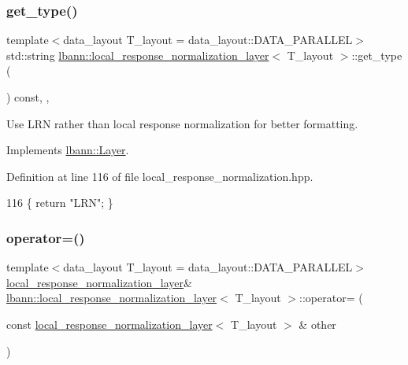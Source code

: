\subsubsection{\texorpdfstring{get\+\_\+type()}{get\_type()}}
{\footnotesize\ttfamily template$<$data\+\_\+layout T\+\_\+layout = data\+\_\+layout\+::\+D\+A\+T\+A\+\_\+\+P\+A\+R\+A\+L\+L\+EL$>$ \\
std\+::string \hyperlink{classlbann_1_1local__response__normalization__layer}{lbann\+::local\+\_\+response\+\_\+normalization\+\_\+layer}$<$ T\+\_\+layout $>$\+::get\+\_\+type (\begin{DoxyParamCaption}{ }\end{DoxyParamCaption}) const\hspace{0.3cm}{\ttfamily [inline]}, {\ttfamily [override]}, {\ttfamily [virtual]}}



Use L\+RN rather than local response normalization for better formatting. 



Implements \hyperlink{classlbann_1_1Layer_a0fa0ea9160b490c151c0a17fde4f7239}{lbann\+::\+Layer}.



Definition at line 116 of file local\+\_\+response\+\_\+normalization.\+hpp.


\begin{DoxyCode}
116 \{ \textcolor{keywordflow}{return} \textcolor{stringliteral}{"LRN"}; \}
\end{DoxyCode}
\mbox{\label{classlbann_1_1local__response__normalization__layer_a7a1e5eb532bbf72c6334ac865d0694a3}} 
\subsubsection{\texorpdfstring{operator=()}{operator=()}}
{\footnotesize\ttfamily template$<$data\+\_\+layout T\+\_\+layout = data\+\_\+layout\+::\+D\+A\+T\+A\+\_\+\+P\+A\+R\+A\+L\+L\+EL$>$ \\
\hyperlink{classlbann_1_1local__response__normalization__layer}{local\+\_\+response\+\_\+normalization\+\_\+layer}\& \hyperlink{classlbann_1_1local__response__normalization__layer}{lbann\+::local\+\_\+response\+\_\+normalization\+\_\+layer}$<$ T\+\_\+layout $>$\+::operator= (\begin{DoxyParamCaption}\item[{const \hyperlink{classlbann_1_1local__response__normalization__layer}{local\+\_\+response\+\_\+normalization\+\_\+layer}$<$ T\+\_\+layout $>$ \&}]{other }\end{DoxyParamCaption})\hspace{0.3cm}{\ttfamily [inline]}}



